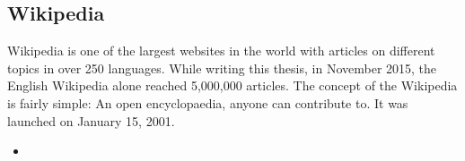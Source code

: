 \subsection{Wikipedia}
Wikipedia is one of the largest websites in the world with articles on different topics in over 250 languages. While writing this thesis, in November 2015, the English Wikipedia alone reached 5,000,000 articles. 
The concept of the Wikipedia is fairly simple: An open encyclopaedia, anyone can contribute to. It was launched on January 15, 2001. 

\begin{itemize}
\item
\end{itemize}

